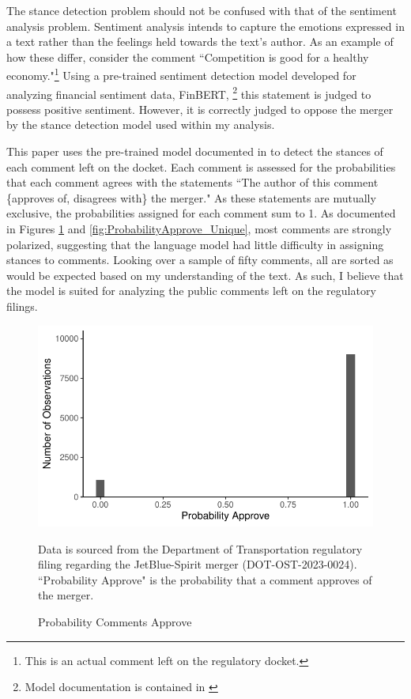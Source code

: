 \documentclass{article}
\begin{document}
\begin{appendices}
The stance detection problem should not be confused with that of the sentiment analysis problem. Sentiment analysis intends to capture the emotions expressed in a text rather than the feelings held towards the text's author. As an example of how these differ, consider the comment ``Competition is good for a healthy economy."\footnote{This is an actual comment left on the regulatory docket.} Using a pre-trained sentiment detection model developed for analyzing financial sentiment data, FinBERT, \footnote{Model documentation is contained in \citet{araci_finbert_2019}} this statement is judged to possess positive sentiment. However, it is correctly judged to oppose the merger by the stance detection model used within my analysis. 

This paper uses the pre-trained model documented in \citet{laurer_less_2024} to detect the stances of each comment left on the docket. Each comment is assessed for the probabilities that each comment agrees with the statements ``The author of this comment \{approves of, disagrees with\} the merger." As these statements are mutually exclusive, the probabilities assigned for each comment sum to 1. As documented in Figures \ref{fig:ProbabilityApprove} and \ref{fig:ProbabilityApprove_Unique}, most comments are strongly polarized, suggesting that the language model had little difficulty in assigning stances to comments. Looking over a sample of fifty comments, all are sorted as would be expected based on my understanding of the text. As such, I believe that the model is suited for analyzing the public comments left on the regulatory filings.  

	\begin{figure}
		\caption{Probability Comments Approve}
		\label{fig:ProbabilityApprove}
        \begin{center}
        \includegraphics{05.Figures/stance_strength_graph}
        \end{center}
		\begin{minipage}{\textwidth} 
			{\footnotesize Data is sourced from the Department of Transportation regulatory filing regarding the JetBlue-Spirit merger (DOT-OST-2023-0024). ``Probability Approve" is the probability that a comment approves of the merger.} 
		\end{minipage}
	\end{figure}
	

\end{appendices}
\end{document}
